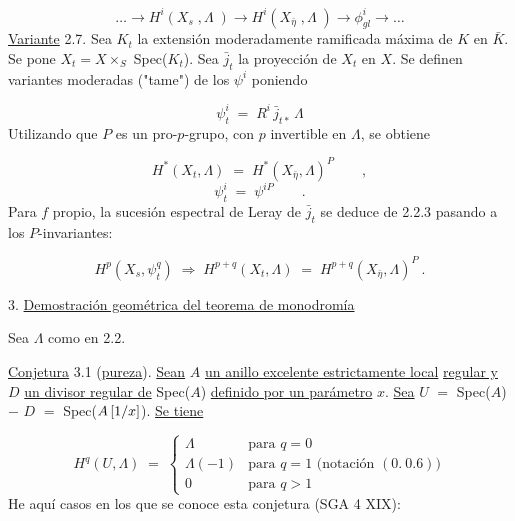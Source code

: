 \begin{equation*}\tag{2.6.2}
\dots \longrightarrow H^i(X_s\;,\Lambda\;) \longrightarrow H^i(X_{\bar{\eta}}\;,\Lambda\;) \longrightarrow \phi^i_{gl} \longrightarrow \dots
\end{equation*}
\underline{Variante} 2.7.  Sea $K_t$ la extensión moderadamente ramificada máxima de $K$ en $\bar{K}$. Se pone $X_t = X \times_S$ Spec($K_t$). Sea $\bar{j}_t$ la proyección de $X_t$ en $X$. Se definen variantes moderadas ("tame") de los $\psi^i$ poniendo



\begin{equation*}
\psi^{i}_{t} \;=\; R^{i}\,\bar{j}_{t*}\,\Lambda
\end{equation*}
Utilizando que $P$ es un pro-$p$-grupo, con $p$ invertible en $\Lambda$, se obtiene

\begin{equation}\tag{2.7.1}
H^{*}(X_{t},\Lambda) \;=\; H^{*}(X_{\bar{\eta}},\Lambda)^{P} \qquad ,
\end{equation}
\begin{equation}\tag{2.7.2}
\psi^{i}_{t} \;=\; \psi^{iP} \qquad .
\end{equation}
Para $f$ propio, la sucesión espectral de Leray de $\bar{j}_{t}$ se deduce de 2.2.3 pasando a los $P$-invariantes:

\begin{equation}\tag{2.7.3}
H^{p}(X_{s},\psi^{q}_{t}) \;\Longrightarrow\; H^{p+q}(X_{t},\Lambda) \;=\; H^{p+q}(X_{\bar{\eta}},\Lambda)^{P}\ .
\end{equation}

3. \underline{Demostración geométrica del teorema de monodromía}

Sea $\Lambda$ como en 2.2.

\underline{Conjetura} 3.1 (\underline{pureza}). \underline{Sean} $A$ \underline{un anillo excelente estrictamente local}  \underline{regular y} $D$ \underline{un divisor regular de} Spec($A$) \underline{definido por un parámetro} $x$. \underline{Sea} $U$ $=$ Spec($A$) $-$ $D$ $=$ Spec($A\left[\sisi{1/X}{1/x}\right]$). \underline{Se tiene}

\begin{equation}\tag{3.1.1}
H^{q}(U,\Lambda) \;=\; \left\{\begin{array}{ll} \Lambda & \text{para } q = 0 \\[4pt] \Lambda(-1) & \text{para } q = 1 \text{ (notación } (0.\ 0.6)) \\[4pt] 0 & \text{para } q > 1 \end{array}\right.
\end{equation}
He aquí casos en los que se conoce esta conjetura (SGA 4 XIX):

